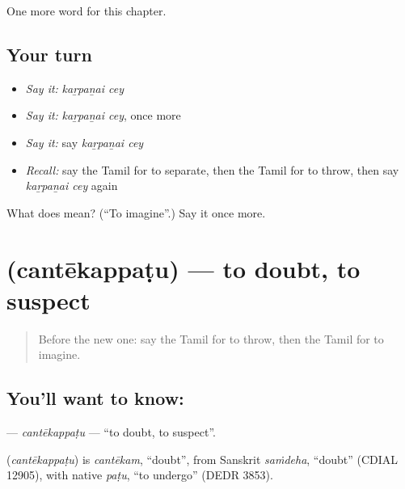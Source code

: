 \begin{grammarlens}[title={What you've built}]
One more word for this chapter.
\end{grammarlens}

\subsection*{Your turn}
\begin{itemize}
\raggedright
  \item \emph{Say it:} \emph{kaṟpaṉai cey}
  \item \emph{Say it:} \emph{kaṟpaṉai cey}, once more
  \item \emph{Say it:} say \emph{kaṟpaṉai cey}
  \item \emph{Recall:} say the Tamil for to separate, then the Tamil for to throw, then say \emph{kaṟpaṉai cey} again
\end{itemize}

\begin{tcolorbox}[breakable,colback=teal!4,colframe=teal!35!black,title={Before you move on}]
What does   mean? (\textquotedblleft{}To imagine\textquotedblright{}.) Say it once more.
\end{tcolorbox}
\section[\texorpdfstring{\ta{சந்தேகப்படு} (cantēkappaṭu)}{சந்தேகப்படு (cantēkappaṭu)}]{ (cantēkappaṭu) — to doubt, to suspect}

\label{lesson:TA-C230-cantekappatu}



\begin{quote}
Before the new one: say the Tamil for to throw, then the Tamil for to imagine.
\end{quote}

\subsection*{You'll want to know: }
\textbf{} — \emph{cantēkappaṭu} — \textquotedblleft{}to doubt, to suspect\textquotedblright{}.

\begin{cousinweb}
\textbf{} (\emph{cantēkappaṭu}) is \emph{cantēkam}, \textquotedblleft{}doubt\textquotedblright{}, from Sanskrit \emph{saṁdeha}, \textquotedblleft{}doubt\textquotedblright{} (CDIAL 12905), with native \emph{paṭu}, \textquotedblleft{}to undergo\textquotedblright{} (DEDR 3853).
\end{cousinweb}

